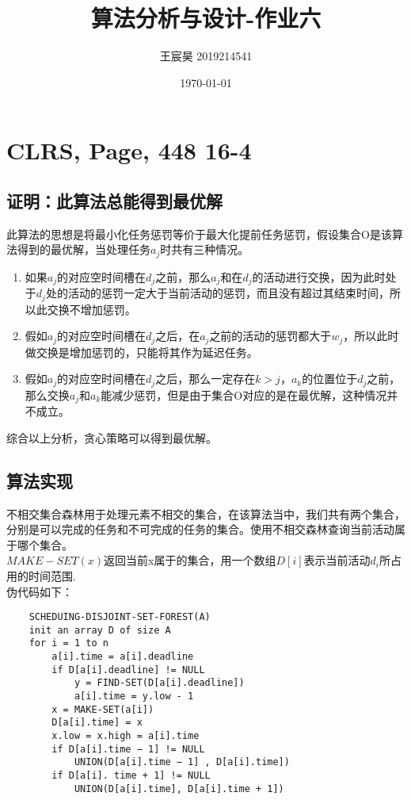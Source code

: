 \documentclass[UTF8]{ctexart}
\title{算法分析与设计-作业六}
\author{王宸昊 2019214541}
\date{\today}
\begin{document}
\maketitle


\section{CLRS, Page, 448 16-4}

\subsection{证明：此算法总能得到最优解}

此算法的思想是将最小化任务惩罚等价于最大化提前任务惩罚，假设集合O是该算法得到的最优解，当处理任务$a_j$时共有三种情况。

\begin{enumerate}[1.]
    \item 如果$a_j$的对应空时间槽在$d_j$之前，那么$a_j$和在$d_j$的活动进行交换，因为此时处于$d_j$处的活动的惩罚一定大于当前活动的惩罚，而且没有超过其结束时间，所以此交换不增加惩罚。
    \item 假如$a_j$的对应空时间槽在$d_j$之后，在$a_j$之前的活动的惩罚都大于$w_j$，所以此时做交换是增加惩罚的，只能将其作为延迟任务。
    \item 假如$a_j$的对应空时间槽在$d_j$之后，那么一定存在$k>j$，$a_k$的位置位于$d_j$之前，那么交换$a_j$和$a_k$能减少惩罚，但是由于集合O对应的是在最优解，这种情况并不成立。
\end{enumerate}

综合以上分析，贪心策略可以得到最优解。

\subsection{算法实现}
不相交集合森林用于处理元素不相交的集合，在该算法当中，我们共有两个集合，分别是可以完成的任务和不可完成的任务的集合。使用不相交森林查询当前活动属于哪个集合。\\
$MAKE-SET(x)$返回当前x属于的集合，用一个数组$D[i]$表示当前活动$d_i$所占用的时间范围.\\

伪代码如下：

\begin{lstlisting}
    SCHEDUING-DISJOINT-SET-FOREST(A)
    init an array D of size A 
    for i = 1 to n
        a[i].time = a[i].deadline
        if D[a[i].deadline] != NULL
            y = FIND-SET(D[a[i].deadline])
            a[i].time = y.low - 1
        x = MAKE-SET(a[i])
        D[a[i].time] = x
        x.low = x.high = a[i].time
        if D[a[i].time − 1] != NULL
            UNION(D[a[i].time − 1] , D[a[i].time])
        if D[a[i]. time + 1] != NULL
            UNION(D[a[i].time], D[a[i].time + 1])
 \end{lstlisting}
\end{document}
